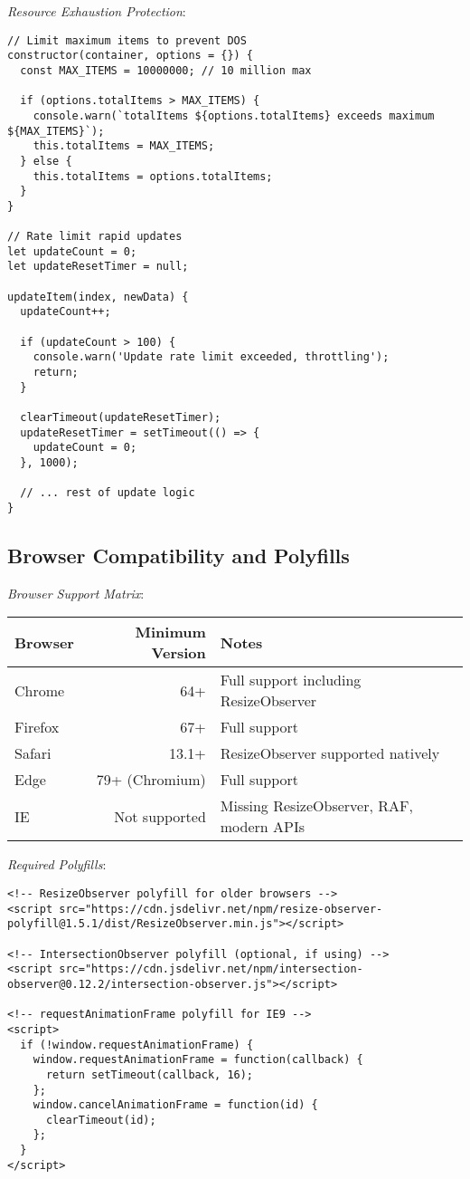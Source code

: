 \documentclass[11pt]{article}
\begin{document}
\emph{Resource Exhaustion Protection}:

\begin{verbatim}
// Limit maximum items to prevent DOS
constructor(container, options = {}) {
  const MAX_ITEMS = 10000000; // 10 million max
  
  if (options.totalItems > MAX_ITEMS) {
    console.warn(`totalItems ${options.totalItems} exceeds maximum ${MAX_ITEMS}`);
    this.totalItems = MAX_ITEMS;
  } else {
    this.totalItems = options.totalItems;
  }
}

// Rate limit rapid updates
let updateCount = 0;
let updateResetTimer = null;

updateItem(index, newData) {
  updateCount++;
  
  if (updateCount > 100) {
    console.warn('Update rate limit exceeded, throttling');
    return;
  }
  
  clearTimeout(updateResetTimer);
  updateResetTimer = setTimeout(() => {
    updateCount = 0;
  }, 1000);
  
  // ... rest of update logic
}
\end{verbatim}
\subsection{Browser Compatibility and Polyfills}
\label{sec:org48927d5}

\emph{Browser Support Matrix}:

\begin{center}
\begin{tabular}{lrl}
Browser & Minimum Version & Notes\\
\hline
Chrome & 64+ & Full support including ResizeObserver\\
Firefox & 67+ & Full support\\
Safari & 13.1+ & ResizeObserver supported natively\\
Edge & 79+ (Chromium) & Full support\\
IE & Not supported & Missing ResizeObserver, RAF, modern APIs\\
\end{tabular}
\end{center}

\emph{Required Polyfills}:

\begin{verbatim}
<!-- ResizeObserver polyfill for older browsers -->
<script src="https://cdn.jsdelivr.net/npm/resize-observer-polyfill@1.5.1/dist/ResizeObserver.min.js"></script>

<!-- IntersectionObserver polyfill (optional, if using) -->
<script src="https://cdn.jsdelivr.net/npm/intersection-observer@0.12.2/intersection-observer.js"></script>

<!-- requestAnimationFrame polyfill for IE9 -->
<script>
  if (!window.requestAnimationFrame) {
    window.requestAnimationFrame = function(callback) {
      return setTimeout(callback, 16);
    };
    window.cancelAnimationFrame = function(id) {
      clearTimeout(id);
    };
  }
</script>
\end{verbatim}
\end{document}
